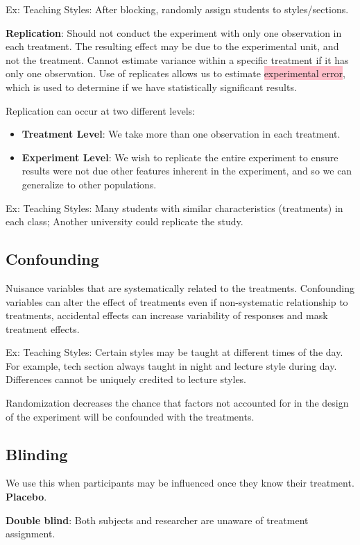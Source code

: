 \documentclass[a4paper,11pt]{article}
\begin{document}
Ex: Teaching Styles: After blocking, randomly assign students to styles/sections. 

\textbf{Replication}: Should not conduct the experiment with only one observation in each treatment. The resulting effect may be due to the experimental unit, and not the treatment. Cannot estimate variance within a specific treatment if it has only one observation. Use of replicates allows us to estimate \colorbox{pink}{experimental error}, which is used to determine if we have statistically significant results. 

Replication can occur at two different levels: 
\begin{itemize}
\item \textbf{Treatment Level}: We take more than one observation in each treatment. 
\item \textbf{Experiment Level}: We wish to replicate the entire experiment to ensure results were not due other features inherent in the experiment, and so we can generalize to other populations. 
\end{itemize}

Ex: Teaching Styles: Many students with similar characteristics (treatments) in each class; Another university could replicate the study.

\subsection{Confounding}
Nuisance variables that are systematically related to the treatments. Confounding variables can alter the effect of treatments even if non-systematic relationship to treatments, accidental effects can increase variability of responses and mask treatment effects. 

Ex: Teaching Styles: Certain styles may be taught at different times of the day. For example, tech section always taught in night and lecture style during day. Differences cannot be uniquely credited to lecture styles. 

Randomization decreases the chance that factors not accounted for in the design of the experiment will be confounded with the treatments. 

\subsection{Blinding}
We use this when participants may be influenced once they know their treatment. \textbf{Placebo}. 

\textbf{Double blind}: Both subjects and researcher are unaware of treatment assignment. 
\end{document}
